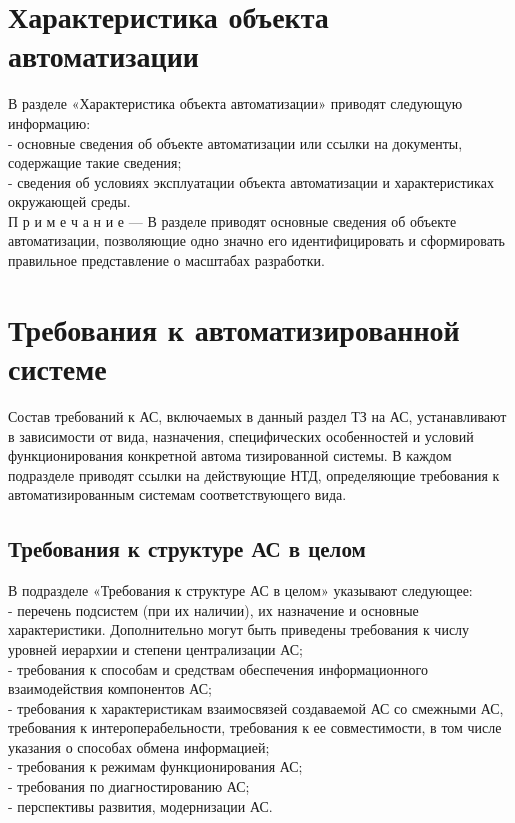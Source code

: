 {\section{Характеристика объекта автоматизации}
В разделе «Характеристика объекта автоматизации» приводят следующую информацию:\\
- основные сведения об объекте автоматизации или ссылки на документы, содержащие такие сведения;\\
- сведения об условиях эксплуатации объекта автоматизации и характеристиках окружающей среды.\\
П р и м е ч а н и е — В разделе приводят основные сведения об объекте автоматизации, позволяющие одно значно его идентифицировать и сформировать правильное представление о масштабах разработки.

\section{Требования к автоматизированной системе}
Состав требований к АС, включаемых в данный раздел ТЗ на АС, устанавливают в зависимости
от вида, назначения, специфических особенностей и условий функционирования конкретной автома
тизированной системы. В каждом подразделе приводят ссылки на действующие НТД, определяющие
требования к автоматизированным системам соответствующего вида.
\subsection{Требования к структуре АС в целом}
В подразделе «Требования к структуре АС в целом» указывают следующее:\\
- перечень подсистем (при их наличии), их назначение и основные характеристики. Дополнительно могут быть приведены требования к числу уровней иерархии и степени централизации АС;\\
- требования к способам и средствам обеспечения информационного взаимодействия компонентов АС;\\
- требования к характеристикам взаимосвязей создаваемой АС со смежными АС, требования к интероперабельности, требования к ее совместимости, в том числе указания о способах обмена информацией;\\
- требования к режимам функционирования АС;\\
- требования по диагностированию АС;\\
- перспективы развития, модернизации АС.\\
}
